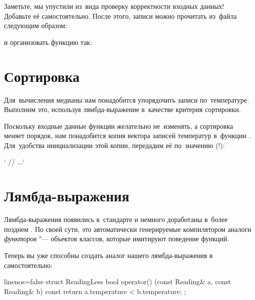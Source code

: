 
\noindent
Заметьте, мы упустили из~вида проверку корректности входных данных! Добавьте её самостоятельно. После этого, записи можно прочитать из~файла следующим образом:


\noindent
и организовать функцию  так:




\section{Сортировка}
Для~вычисления медианы нам понадобится упорядочить записи по~температуре. Выполним это, используя лямбда-выражение в~качестве критерия сортировки.


Поскольку входные данные функции желательно не~изменять, а сортировка меняет порядок, нам понадобится копия вектора записей температур в~функции . Для~удобства инициализации этой копии, передадим её по~значению (!):

\cpp`  // ...`



\section{Лямбда-выражения}\label{sect:lambda}
Лямбда-выражения появились в~стандарте  и немного доработаны в~более позднем . По своей сути, это автоматически генерируемые компилятором аналоги \emph{функторов} "--- объектов классов, которые имитируют поведение функций.

Теперь вы уже способны создать аналог нашего лямбда-выражения в~ самостоятельно:

\begin{cppcode*}{linenos=false}
struct ReadingLess
{
  bool operator() (const Reading& a, const Reading& b) const
  {
    return a.temperature < b.temperature;
  }
};
\end{cppcode*}

